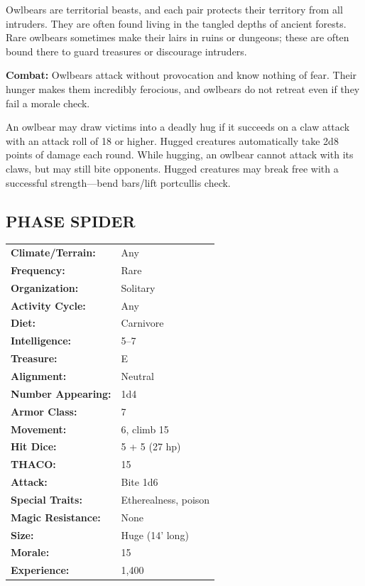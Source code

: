 \begin{multicols}{2}
Owlbears are territorial beasts, and each pair protects their territory from all intruders. They are often found living in the tangled depths of ancient forests. Rare owlbears sometimes make their lairs in ruins or dungeons; these are often bound there to guard treasures or discourage intruders.

\textbf{Combat:} Owlbears attack without provocation and know nothing of fear. Their hunger makes them incredibly ferocious, and owlbears do not retreat even if they fail a morale check.

An owlbear may draw victims into a deadly hug if it succeeds on a claw attack with an attack roll of 18 or higher. Hugged creatures automatically take 2d8 points of damage each round. While hugging, an owlbear cannot attack with its claws, but may still bite opponents. Hugged creatures may break free with a successful strength---bend bars/lift portcullis check.

\noindent
\begin{minipage}{\columnwidth}

\vspace{1em}

\subsection{PHASE SPIDER}

\noindent \begin{tabular}{p{}p{}}
\textbf{Climate/Terrain:}	& Any	\\
\textbf{Frequency:} 		& Rare	\\
\textbf{Organization:} 		& Solitary	\\
\textbf{Activity Cycle:} 	& Any	\\
\textbf{Diet:} 				& Carnivore	\\
\textbf{Intelligence:} 		& 5--7	\\
\textbf{Treasure:} 			& E	\\
\textbf{Alignment:} 		& Neutral	\\
\hline
\textbf{Number Appearing:} 	& 1d4	\\
\textbf{Armor Class:} 		& 7	\\
\textbf{Movement:} 			& 6, climb 15	\\
\textbf{Hit Dice:} 			& 5 + 5 (27 hp)	\\
\textbf{THACO:} 			& 15	\\
\textbf{Attack:} 			& Bite 1d6	\\
\textbf{Special Traits:} & Etherealness, poison	\\
\textbf{Magic Resistance:} 	& None	\\
\textbf{Size:} 				& Huge (14' long)	\\
\textbf{Morale:} 			& 15	\\
\textbf{Experience:} 		& 1,400	\\
\end{tabular}


\end{minipage}
\end{multicols}
